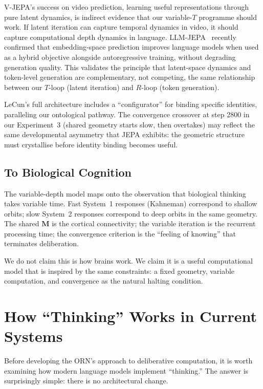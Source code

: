 \documentclass[11pt, a4paper]{article}
\newcommand{\M}{\mathbf{M}}
\theoremstyle{plain}
\theoremstyle{definition}
\theoremstyle{remark}
\begin{document}
V-JEPA's success on video prediction, learning useful representations through pure latent dynamics, is indirect evidence that our variable-$T$ programme should work.
If latent iteration can capture temporal dynamics in video, it should capture computational depth dynamics in language.
LLM-JEPA~\cite{llmjepa2025} recently confirmed that embedding-space prediction improves language models when used as a hybrid objective alongside autoregressive training, without degrading generation quality.
This validates the principle that latent-space dynamics and token-level generation are complementary, not competing, the same relationship between our $T$-loop (latent iteration) and $R$-loop (token generation).

LeCun's full architecture includes a ``configurator'' for binding specific identities, paralleling our ontological pathway.
The convergence crossover at step 2800 in our Experiment~3 (shared geometry starts slow, then overtakes) may reflect the same developmental asymmetry that JEPA exhibits: the geometric structure must crystallise before identity binding becomes useful.

\subsection{To Biological Cognition}

The variable-depth model maps onto the observation that biological thinking takes variable time.
Fast System~1 responses (Kahneman) correspond to shallow orbits; slow System~2 responses correspond to deep orbits in the same geometry.
The shared $\M$ is the cortical connectivity; the variable iteration is the recurrent processing time; the convergence criterion is the ``feeling of knowing'' that terminates deliberation.

We do not claim this is how brains work.
We claim it is a useful computational model that is inspired by the same constraints: a fixed geometry, variable computation, and convergence as the natural halting condition.

\section{How ``Thinking'' Works in Current Systems}\label{sec:current-thinking}

Before developing the ORN's approach to deliberative computation, it is worth examining how modern language models implement ``thinking.''
The answer is surprisingly simple: there is no architectural change.
\end{document}
